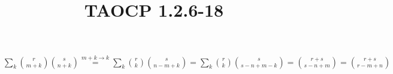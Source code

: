 \documentclass{article}
\title{TAOCP 1.2.6\mbox{-}18}
\begin{document}
\maketitle

\( \sum_{k} \binom{r}{m+k}\binom{s}{n+k} \overset{m + k \to k}{=} \sum_{k} \binom{r}{k}\binom{s}{n-m+k} = \sum_{k} \binom{r}{k}\binom{s}{s-n+m-k} = \binom{r+s}{s-n+m} = \binom{r+s}{r-m+n} \)
\end{document}
